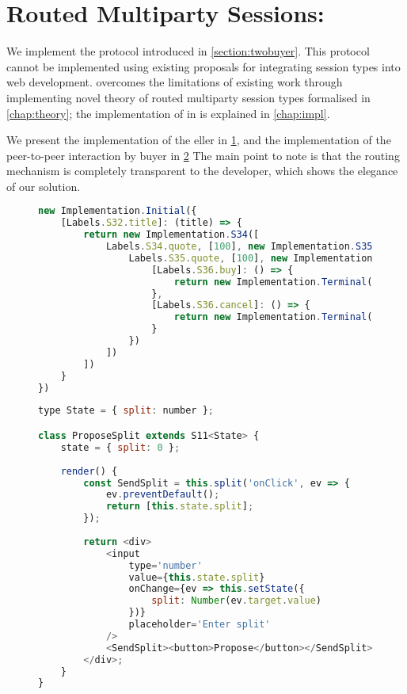 \section{Routed Multiparty Sessions: }
\label{section:evaltwobuyer}

We implement the  protocol
introduced in \cref{section:twobuyer}. 
This protocol cannot be implemented using
existing proposals \cite{PureScript2019,MVU2020} for integrating
session types into web development.
\codegen overcomes the limitations of existing work
through implementing novel theory of routed multiparty
session types formalised in \cref{chap:theory};
the implementation of \newtheory in \codegen is 
explained in \cref{chap:impl}.

We present the implementation of the eller
in \cref{lst:evaltwobuyerseller}, 
and the implementation
of the peer-to-peer interaction by buyer 
in \cref{lst:evaltwobuyerA}
The main point to note is that the routing mechanism
is completely transparent to the developer,
which shows the elegance of our solution.

\begin{figure}[!h]
\begin{lstlisting}[language=javascript]
new Implementation.Initial({
	[Labels.S32.title]: (title) => {
		return new Implementation.S34([
			Labels.S34.quote, [100], new Implementation.S35([
				Labels.S35.quote, [100], new Implementation.S36({
					[Labels.S36.buy]: () => {
						return new Implementation.Terminal();
					},
					[Labels.S36.cancel]: () => {
						return new Implementation.Terminal();
					}
				})
			])
		])
	}
})
\end{lstlisting}
\label{lst:evaltwobuyerseller}
\end{figure}

\begin{figure}[!h]
\begin{lstlisting}[language=javascript]
type State = { split: number };

class ProposeSplit extends S11<State> {
	state = { split: 0 };
	
	render() {
		const SendSplit = this.split('onClick', ev => {
			ev.preventDefault();
			return [this.state.split];		
		});
		
		return <div>
			<input
				type='number'
				value={this.state.split}
				onChange={ev => this.setState({
					split: Number(ev.target.value)
				})}
				placeholder='Enter split'
			/>
			<SendSplit><button>Propose</button></SendSplit>	
		</div>;	
	}
}
\end{lstlisting}
\label{lst:evaltwobuyerA}
\end{figure}

